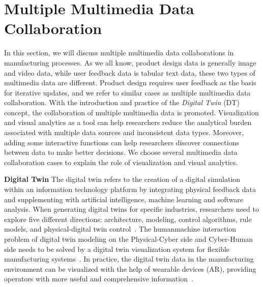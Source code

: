\documentclass[a4paper,fleqn]{cas-dc}
\begin{document}
\section{Multiple Multimedia Data Collaboration}
In this section, we will discuss multiple multimedia data collaborations in manufacturing processes.
As we all know, product design data is generally image and video data, while user feedback data is tabular text data, these two types of multimedia data are different. Product design requires user feedback as the basis for iterative updates, and we refer to similar cases as multiple multimedia data collaboration.
With the introduction and practice of the \textit{Digital Twin} (DT) concept, the collaboration of multiple multimedia data is promoted.
Visualization and visual analytics as a tool can help researchers reduce the analytical burden associated with multiple data sources and inconsistent data types.
Moreover, adding some interactive functions can help researchers discover connections between data to make better decisions.
We choose several multimedia data collaboration cases to explain the role of visualization and visual analytics.

\textbf{Digital Twin}
The digital twin refers to the creation of a digital simulation within an information technology platform by integrating physical feedback data and supplementing with artificial intelligence, machine learning and software analysis. When generating digital twins for specific industries, researchers need to explore five different directions: architecture, modeling, control algorithms, rule models, and physical-digital twin control~\cite{lei2021toward}. The humanmachine interaction problem of digital twin modeling on the Physical-Cyber side and Cyber-Human side needs to be solved by a digital twin visualization system for flexible manufacturing systems~\cite{Fan2021}. In practice, the digital twin data in the manufacturing environment can be visualized with the help of wearable devices (AR), providing operators with more useful and comprehensive information~\cite{Zhu2019}.
\end{document}
